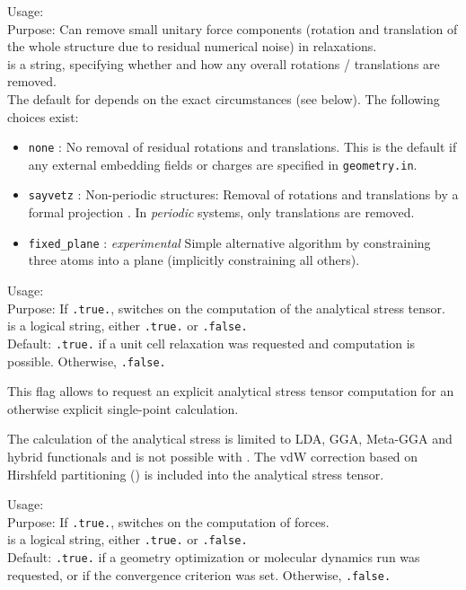{
  \noindent
  Usage:   \\[1.0ex]
  Purpose: Can remove small unitary force components (rotation and
    translation of the whole structure due to residual numerical
    noise) in relaxations. \\[1.0ex] 
   is a string, specifying whether and how any overall
    rotations / translations are removed. \\
}
The default for  depends on the exact circumstances (see
below). The following choices exist: 
\begin{itemize}
  \item \texttt{none} : No removal of residual rotations and
    translations. This is the default if any external embedding fields
    or charges are specified in \texttt{geometry.in}.
  \item \texttt{sayvetz} : Non-periodic structures: Removal of
    rotations and translations by a formal projection
    \cite{Eckart35,Sayvetz39}. In \emph{periodic} systems,
    only translations are removed.
  \item \texttt{fixed\_plane} : \emph{experimental} Simple alternative
    algorithm by constraining three atoms into a plane (implicitly
    constraining all others). 
\end{itemize}

{
  \noindent
  Usage:   \\[1.0ex]
  Purpose: If \texttt{.true.}, switches on the computation of
  the analytical stress tensor. \\[1.0ex] 
   is a logical string, either \texttt{.true.} or
    \texttt{.false.} \\
}
Default: \texttt{.true.} if a unit cell relaxation was requested and computation
is possible. Otherwise, \texttt{.false.}

This flag allows to request an explicit analytical stress tensor computation
for an otherwise explicit single-point calculation.

The calculation of the analytical stress is limited to LDA, GGA, Meta-GGA and 
hybrid functionals and is not possible with . The vdW
correction based on Hirshfeld partitioning ()
is included into the analytical stress tensor.

{
  \noindent
  Usage:   \\[1.0ex]
  Purpose: If \texttt{.true.}, switches on the computation of
    forces. \\[1.0ex] 
   is a logical string, either \texttt{.true.} or
    \texttt{.false.} \\
} 
Default: \texttt{.true.} if a geometry optimization or
molecular dynamics run was requested, or if the 
 convergence criterion was
set. Otherwise, \texttt{.false.} 

